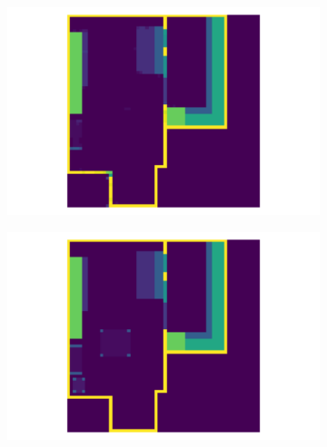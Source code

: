 \documentclass[binding=0.6cm,noexaminfo]{sapthesis}
\begin{document}
\begin{figure}[h!]
\centering
\begin{subfigure}{.49\textwidth}
	\centering
	\includegraphics[width=.90\linewidth]{results/top_pred_0}
	\caption{}
\end{subfigure}
\begin{subfigure}{.49\textwidth}
	\centering
	\includegraphics[width=.90\linewidth]{results/top_true_0}
	\caption{}
\end{subfigure}


\end{figure}
\end{document}
